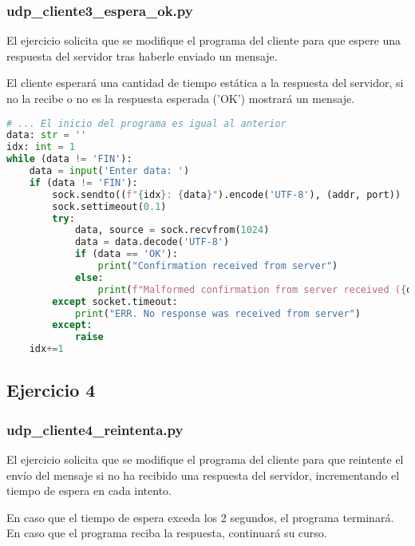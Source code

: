 \subsubsection{udp\_cliente3\_espera\_ok.py}

El ejercicio solicita que se modifique el programa del cliente para que espere una respuesta del servidor
tras haberle enviado un mensaje.

El cliente esperará una cantidad de tiempo estática a la respuesta del servidor, si no la recibe o 
no es la respuesta esperada ('OK') mostrará un mensaje.

\begin{lstlisting}[language=Python]
# ... El inicio del programa es igual al anterior
data: str = ''
idx: int = 1
while (data != 'FIN'):
    data = input('Enter data: ')
    if (data != 'FIN'):
        sock.sendto((f"{idx}: {data}").encode('UTF-8'), (addr, port))
        sock.settimeout(0.1)
        try:
            data, source = sock.recvfrom(1024)
            data = data.decode('UTF-8')
            if (data == 'OK'):
                print("Confirmation received from server")
            else:
                print(f"Malformed confirmation from server received ({data})")
        except socket.timeout:
            print("ERR. No response was received from server")
        except:
            raise
    idx+=1
\end{lstlisting}

\subsection{Ejercicio 4}

\subsubsection{udp\_cliente4\_reintenta.py}

El ejercicio solicita que se modifique el programa del cliente para que reintente el envío del mensaje
si no ha recibido una respuesta del servidor, incrementando el tiempo de espera en cada intento.

En caso que el tiempo de espera exceda los 2 segundos, el programa terminará.
En caso que el programa reciba la respuesta, continuará su curso.

